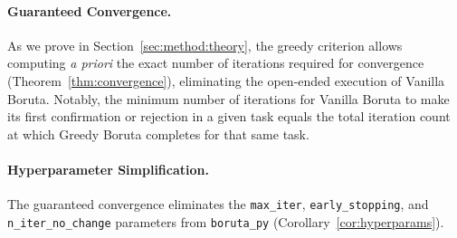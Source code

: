\documentclass[runningheads]{llncs}
\begin{document}
\paragraph{Guaranteed Convergence.}
As we prove in Section~\ref{sec:method:theory}, the greedy criterion allows computing \emph{a priori} the exact number of iterations required for convergence (Theorem~\ref{thm:convergence}), eliminating the open-ended execution of Vanilla Boruta. Notably, the minimum number of iterations for Vanilla Boruta to make its first confirmation or rejection in a given task equals the total iteration count at which Greedy Boruta completes for that same task.




\paragraph{Hyperparameter Simplification.}
The guaranteed convergence eliminates the \texttt{max\_iter}, \texttt{early\_stopping}, and \texttt{n\_iter\_no\_change} parameters from \texttt{boruta\_py} (Corollary~\ref{cor:hyperparams}).
\end{document}
